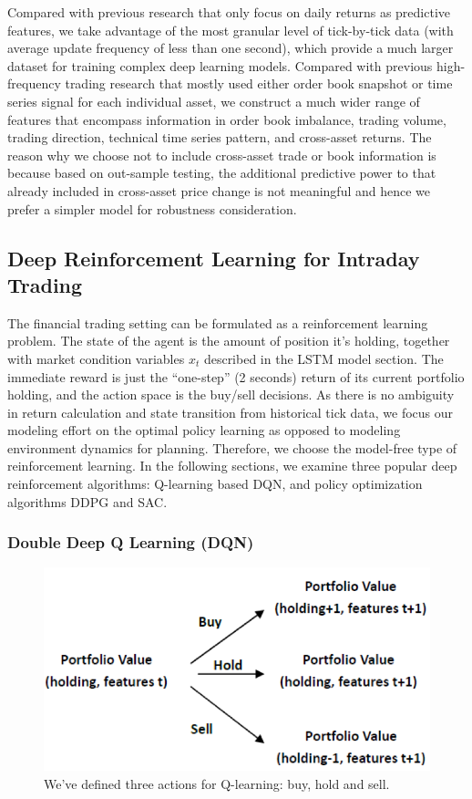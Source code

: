 \documentclass{article}
\begin{document}
Compared with previous research that only focus on daily returns as predictive features, we take advantage of the most granular level of tick-by-tick data (with average update frequency of less than one second), which provide a much larger dataset for training complex deep learning models. Compared with previous high-frequency trading research that mostly used either order book snapshot or time series signal for each individual asset, we construct a much wider range of features that encompass information in order book imbalance, trading volume, trading direction, technical time series pattern, and cross-asset returns. The reason why we choose not to include cross-asset trade or book information is because based on out-sample testing, the additional predictive power to that already included in cross-asset price change is not meaningful and hence we prefer a simpler model for robustness consideration.

\subsection{Deep Reinforcement Learning for Intraday Trading}

The financial trading setting can be formulated as a reinforcement learning problem. The state of the agent is the amount of position it’s holding, together with market condition variables $x_t$ described in the LSTM model section. The immediate reward is just the “one-step” (2 seconds) return of its current portfolio holding, and the action space is the buy/sell decisions. As there is no ambiguity in return calculation and state transition from historical tick data, we focus our modeling effort on the optimal policy learning as opposed to modeling environment dynamics for planning. Therefore, we choose the model-free type of reinforcement learning. In the following sections, we examine three popular deep reinforcement algorithms: Q-learning based DQN, and policy optimization algorithms DDPG and SAC.

\subsubsection{Double Deep Q Learning (DQN)}

\begin{figure}[h]
	\includegraphics[width=\linewidth]{rl_strat.png}
	\caption{We've defined three actions for Q-learning: buy, hold and sell.}
	\label{fig:rl_strat}
\end{figure}
\end{document}
